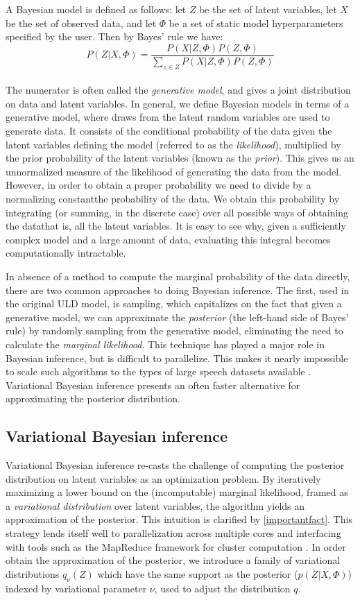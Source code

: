 \documentclass[12pt,letterpaper]{article}
\begin{document}
A Bayesian model is defined as follows: let $Z$ be the set of latent variables, let $X$ be the set of observed data, and let $\Phi$ be a set of static model hyperparameters specified by the user. Then by Bayes' rule we have: $$P(Z|X, \Phi) = \frac{P(X|Z, \Phi)P(Z, \Phi)}{\sum\limits_{ z \in Z} P(X|Z, \Phi)P(Z, \Phi)}$$\\ The numerator is often called the \textit{generative model}, and gives a joint distribution on data and latent variables. In general, we define Bayesian models in terms of a generative model, where draws from the latent random variables are used to generate data. It consists of the conditional probability of the data given the latent variables defining the model (referred to as the \textit{likelihood}), multiplied by the prior probability of the latent variables (known as the \textit{prior}). This gives us an unnormalized measure of the likelihood of generating the data from the model. However, in order to obtain a proper probability we need to divide by a normalizing constant\textemdash the probability of the data. We obtain this probability by integrating (or summing, in the discrete case) over all possible ways of obtaining the data\textemdash that is, all the latent variables. It is easy to see why, given a sufficiently complex model and a large amount of data, evaluating this integral becomes computationally intractable. 

In absence of a method to compute the marginal probability of the data directly, there are two common approaches to doing Bayesian inference. The first, used in the original ULD model, is sampling, which capitalizes on the fact that given a generative model, we can approximate the \textit{posterior} (the left-hand side of Bayes' rule) by randomly sampling from the generative model, eliminating the need to calculate the \textit{marginal likelihood}. This technique has played a major role in Bayesian inference, but is difficult to parallelize. This makes it nearly impossible to scale such algorithms to the types of large speech datasets available \citep{blei:2017}. Variational Bayesian inference presents an often faster alternative for approximating the posterior distribution. 

\subsection{Variational Bayesian inference}
Variational Bayesian inference re-casts the challenge of computing the posterior distribution on latent variables as an optimization problem. By iteratively maximizing a lower bound on the (incomputable) marginal likelihood, framed as a \textit{variational distribution} over latent variables, the algorithm yields an approximation of the posterior. This intuition is clarified by \hyperref[importantfact]{\eqref{importantfact}}. This strategy lends itself well to parallelization across multiple cores and interfacing with tools such as the MapReduce framework for cluster computation \citep{zhai:2012}. In order obtain the approximation of the posterior, we introduce a family of variational distributions $q_{\nu}(Z)$ which have the same support as the posterior ($p(Z|X, \Phi)$) indexed by variational parameter $\nu$, used to adjust the distribution $q$. 
\end{document}
